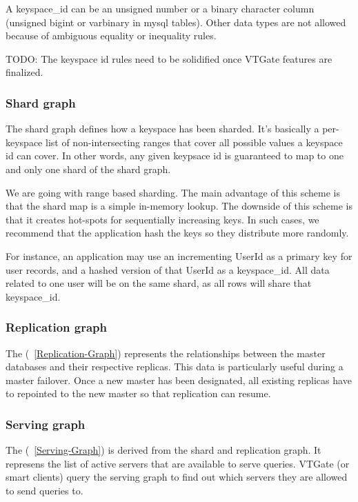 A keyspace\_id can be an unsigned number or a binary character column (unsigned bigint or varbinary in mysql tables). Other data types are not allowed because of ambiguous equality or inequality rules.

TODO: The keyspace id rules need to be solidified once VTGate features are finalized.

\subsubsection{Shard graph}\hypertarget{shard-graph}{}\label{shard-graph}

The shard graph defines how a keyspace has been sharded. It's basically a per-keyspace list of non-intersecting ranges that cover all possible values a keyspace id can cover.
In other words, any given keypsace id is guaranteed to map to one and only one
shard of the shard graph.

We are going with range based sharding.
The main advantage of this scheme is that the shard map is a simple in-memory lookup.
The downside of this scheme is that it creates hot-spots for sequentially increasing keys.
In such cases, we recommend that the application hash the keys so they
distribute more randomly.

For instance, an application may use an incrementing UserId as a primary key for user records, and a hashed version of that UserId as a keyspace\_id. All data related to one user will be on the same shard, as all rows will share that keyspace\_id.

\subsubsection{Replication graph}\hypertarget{replication-graph}{}\label{replication-graph}

The (~\ref{Replication-Graph}) represents the relationships between the master
databases and their respective replicas.
This data is particularly useful during a master failover.
Once a new master has been designated, all existing replicas have to
repointed to the new master so that replication can resume.

\subsubsection{Serving graph}

The (~\ref{Serving-Graph}) is derived from the shard and replication graph.
It represens the list of active servers that are available to serve
queries.
VTGate (or smart clients) query the serving graph to find out which servers
they are allowed to send queries to.

